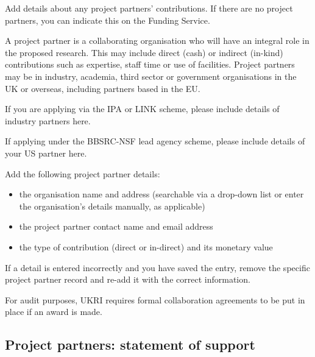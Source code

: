 \documentclass[11pt]{article}
\newenvironment{instruction}{%
    \begin{tcolorbox}[breakable,colback=red!5,colframe=red,title=Instruction]%
	}{%
    	\end{tcolorbox}%
	}
\begin{document}
\begin{instruction}

Add details about any project partners’ contributions. If there are no project
partners, you can indicate this on the Funding Service.

A project partner is a collaborating organisation who will have an integral
role in the proposed research. This may include direct (cash) or indirect
(in-kind) contributions such as expertise, staff time or use of facilities.
Project partners may be in industry, academia, third sector or government
organisations in the UK or overseas, including partners based in the EU.

If you are applying via the IPA or LINK scheme, please include details of
industry partners here.

If applying under the BBSRC-NSF lead agency scheme, please include details
of your US partner here.

Add the following project partner details:

\begin{itemize}

    \item the organisation name and address (searchable via a drop-down list or enter
the organisation’s details manually, as applicable)

    \item the project partner contact name and email address

    \item the type of contribution (direct or in-direct) and its monetary value

\end{itemize}

If a detail is entered incorrectly and you have saved the entry, remove the
specific project partner record and re-add it with the correct information.

For audit purposes, UKRI requires formal collaboration agreements to be put in
place if an award is made.

\end{instruction}

% 

\pagebreak
\subsection{Project partners: statement of support}
\end{document}
